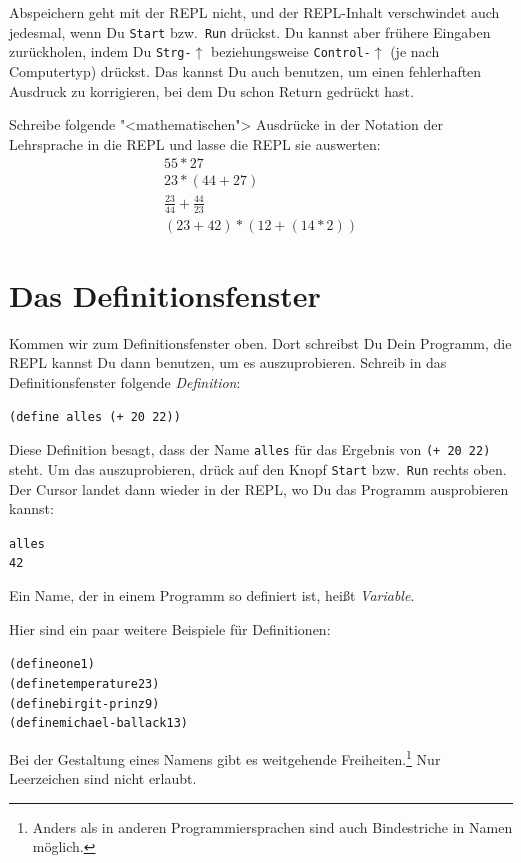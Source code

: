 Abspeichern geht mit der REPL nicht, und der REPL-Inhalt verschwindet
auch jedesmal, wenn Du \texttt{Start} bzw.\ \texttt{Run} drückst.  Du
kannst aber frühere Eingaben zurückholen, indem Du
\texttt{Strg-$\uparrow$} beziehungsweise \texttt{Control-$\uparrow$}
(je nach Computertyp) drückst.  Das kannst Du auch benutzen, um einen
fehlerhaften Ausdruck zu korrigieren, bei dem Du schon Return gedrückt hast.

\begin{aufgabeinline}
  Schreibe folgende "<mathematischen"> Ausdrücke in der Notation der
  Lehrsprache in die REPL und lasse die REPL sie auswerten:
  \begin{displaymath}
    \begin{array}{c}
      55 * 27\\
      23 * (44 + 27)\\
      \frac{23}{44} + \frac{44}{23}\\
      (23 + 42) * (12 + (14 * 2))
    \end{array}
  \end{displaymath}
\end{aufgabeinline}
%
\section{Das Definitionsfenster}

Kommen wir zum Definitionsfenster oben.  Dort schreibst Du Dein
Programm, die REPL kannst Du dann benutzen, um es auszuprobieren.
Schreib in das Definitionsfenster folgende
\textit{Definition}:
%
\begin{verbatim}
(define alles (+ 20 22))
\end{verbatim}
%
Diese Definition besagt, dass der Name \texttt{alles} für das Ergebnis
von \texttt{(+ 20 22)} steht.  Um das auszuprobieren, drück auf den
Knopf \texttt{Start} bzw.\ \texttt{Run} rechts oben.  Der Cursor
landet dann wieder in der REPL, wo Du das Programm ausprobieren
kannst:
%
\begin{alltt}
alles
\evalsto{} 42
\end{alltt}
%
Ein Name, der in einem Programm so definiert ist, heißt
\textit{Variable}.

Hier sind ein paar weitere Beispiele für Definitionen:
%
\begin{alltt}
(define one 1)
(define temperature 23)
(define birgit-prinz 9)
(define michael-ballack 13)
\end{alltt}
%
Bei der Gestaltung eines Namens gibt es weitgehende
Freiheiten.\footnote{Anders als in anderen Programmiersprachen sind
  auch Bindestriche in Namen möglich.}  Nur Leerzeichen sind nicht
erlaubt.

